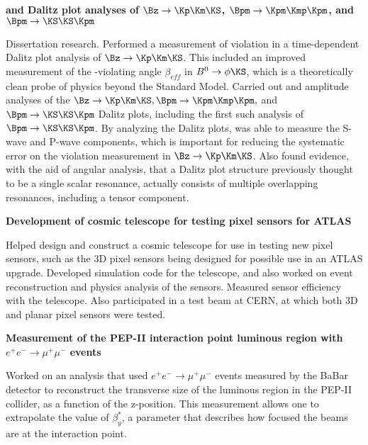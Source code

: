 \documentclass[12pt,letterpaper]{MACPcv}
\newcommand{\bkkkboth}{\ensuremath{ \Bpm \rightarrow \Kpm\Kmp\Kpm}\xspace}
\newcommand{\bkksks}{\ensuremath{ \Bpm \rightarrow \KS\KS\Kpm}\xspace}
\newcommand{\bkkks}{\ensuremath{\Bz \rightarrow \Kp\Km\KS}\xspace}
\begin{document}
\begin{cv}
\begin{Simplelist}

\item
{\bf {\boldmath \CP} and Dalitz plot analyses of {\boldmath \bkkks, \bkkkboth}, and {\boldmath \bkksks}}

Dissertation research. Performed a measurement of \CP violation in a time-dependent
Dalitz plot analysis of \bkkks.  This included an improved measurement of the
\CP-violating angle $\beta_{eff}$ in $B^0\to\phi\KS$, which is a theoretically clean
probe of physics beyond the Standard Model.  Carried out \CP and amplitude analyses of the 
$\bkkks,\bkkkboth,$ and $\bkksks$ Dalitz plots, including the first such analysis of \bkksks. 
By analyzing the Dalitz plots, was able to measure the S-wave and P-wave
components, which is important for reducing the systematic error on the \CP violation 
measurement in $\bkkks$.  Also found evidence, with the aid of angular analysis, that
a Dalitz plot structure previously thought to be a single scalar resonance, actually
consists of multiple overlapping resonances, including a tensor component.  %
\\
\item
{\bf Development of cosmic telescope for testing pixel sensors for ATLAS}

Helped design and construct a cosmic telescope for use in testing new pixel 
sensors, such as the 3D pixel sensors
being designed for possible use in an ATLAS upgrade. Developed simulation code
for the telescope, and also worked on event reconstruction and physics analysis
of the sensors. Measured sensor efficiency with
the telescope.  Also participated in a test beam at CERN, at which both 3D and
planar pixel sensors were tested.   

\item
{\bf Measurement of the PEP-II interaction point luminous region with {\boldmath 
$e^+e^-\rightarrow\mu^+\mu^-$} events}

Worked on an analysis that used $e^+e^-\rightarrow\mu^+\mu^-$ events measured by the BaBar 
detector to reconstruct the transverse size of the luminous region in the PEP-II collider,
as a function of the z-position. This measurement allows one to 
extrapolate the value of $\beta^{*}_y$, a parameter that describes how
focused the beams are at the interaction point.






\end{Simplelist}
\end{cv}
\end{document}
